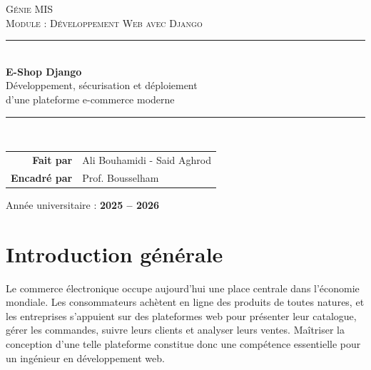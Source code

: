 \documentclass[11pt,a4paper]{report}
\begin{document}
\begin{titlepage}
\centering
\vspace*{1cm}

{\scshape\large Génie MIS}\\[0.3cm]
{\scshape Module : Développement Web avec Django}\\[1.2cm]

\rule{\linewidth}{0.4pt}\\[0.4cm]
{\Huge\bfseries\color{eshopviolet} E-Shop Django}\\[0.5cm]
{\LARGE Développement, sécurisation et déploiement\\ d'une plateforme e-commerce moderne}\\[0.4cm]
\rule{\linewidth}{0.4pt}\\[1.0cm]


\vfill

\begin{tabular}{rl}


  \textbf{Fait par } & Ali Bouhamidi   -   
Said Aghrod \\[2pt]
  \textbf{Encadré par } & Prof. Bousselham \\
\end{tabular}

\vspace{1cm}
{\large Année universitaire : \textbf{2025 -- 2026}}

\end{titlepage}

\tableofcontents
\thispagestyle{fancy}

\chapter{Introduction générale}

Le commerce électronique occupe aujourd'hui une place centrale dans l'économie
mondiale. Les consommateurs achètent en ligne des produits de toutes natures, et
les entreprises s'appuient sur des plateformes web pour présenter leur catalogue,
gérer les commandes, suivre leurs clients et analyser leurs ventes. Maîtriser la
conception d'une telle plateforme constitue donc une compétence essentielle pour
un ingénieur en développement web.
\end{document}
